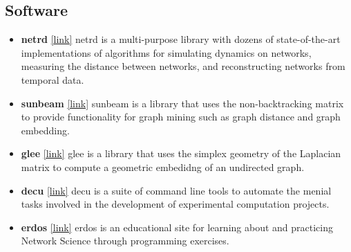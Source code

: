 \documentclass[12pt,]{scrartcl}
\begin{document}
\subsection{Software}\label{software}
\begin{itemize}
\leftskip-0.25in

\item \textbf{netrd} \href{https://github.com/netsiphd/netrd}{[link]} netrd is a multi-purpose library with dozens of state-of-the-art implementations of algorithms for simulating dynamics on networks, measuring the distance between networks, and reconstructing networks from temporal data.

\item \textbf{sunbeam} \href{https://github.com/leotrs/sunbeam}{[link]} sunbeam is a library that uses the non-backtracking matrix to provide functionality for graph mining such as graph distance and graph embedding.

\item \textbf{glee} \href{https://github.com/leotrs/glee}{[link]} glee is a library that uses the simplex geometry of the Laplacian matrix to compute a geometric embedidng of an undirected graph.

\item \textbf{decu} \href{https://github.com/leotrs/decu}{[link]} decu is a suite of command line tools to automate the menial tasks involved in the development of experimental computation projects.

\item \textbf{erdos} \href{http://www.erdosnet.work}{[link]} erdos is an educational site for learning about and practicing Network Science through programming exercises.

\end{itemize}


\newpage
\end{document}

